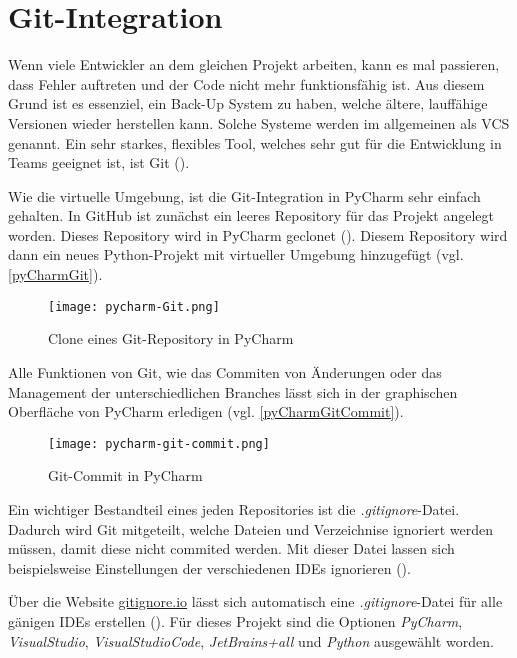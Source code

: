 \section{Git-Integration}
Wenn viele Entwickler an dem gleichen Projekt arbeiten, kann es mal passieren, 
dass Fehler auftreten und der Code nicht mehr funktionsfähig ist. 
Aus diesem Grund ist es essenziel, ein Back-Up System zu haben, 
welche ältere, lauffähige Versionen wieder herstellen kann. 
Solche Systeme werden im allgemeinen als \acf{VCS} genannt. 
Ein sehr starkes, flexibles Tool, welches sehr gut für die Entwicklung in Teams geeignet ist, ist Git (\cite[S. 1]{loeliger_version_2012}).

Wie die virtuelle Umgebung, ist die Git-Integration in PyCharm sehr einfach gehalten.
In GitHub ist zunächst ein leeres Repository für das Projekt angelegt worden. Dieses Repository
wird in PyCharm geclonet (\cite{pyCharmGit}). Diesem Repository wird dann ein neues Python-Projekt mit virtueller Umgebung hinzugefügt (vgl. \autoref{pyCharmGit}).

\begin{figure}[h]
    \centering
    \texttt{[image: pycharm-Git.png]}
    \caption{Clone eines Git-Repository in PyCharm}
    \label{pyCharmGit}
\end{figure}

Alle Funktionen von Git, wie das Commiten von Änderungen oder das Management der unterschiedlichen Branches
lässt sich in der graphischen Oberfläche von PyCharm erledigen (vgl. \autoref{pyCharmGitCommit}).

\begin{figure}[h]
    \centering
    \texttt{[image: pycharm-git-commit.png]}
    \caption{Git-Commit in PyCharm}
    \label{pyCharmGitCommit}
\end{figure}

Ein wichtiger Bestandteil eines jeden Repositories ist die \textit{.gitignore}-Datei. 
Dadurch wird Git mitgeteilt, welche Dateien und Verzeichnise ignoriert werden müssen, damit diese nicht commited werden.
Mit dieser Datei lassen sich beispielsweise Einstellungen der verschiedenen \acp{IDE} ignorieren (\cite{github_Ignore}).

Über die Website \href{https://www.toptal.com/developers/gitignore/}{gitignore.io} lässt sich automatisch eine \textit{.gitignore}-Datei für alle gänigen \acp{IDE} erstellen (\cite{gitignore_io}).
Für dieses Projekt sind die Optionen \textit{PyCharm}, \textit{VisualStudio}, \textit{VisualStudioCode}, \textit{JetBrains+all} und \textit{Python} ausgewählt worden.

